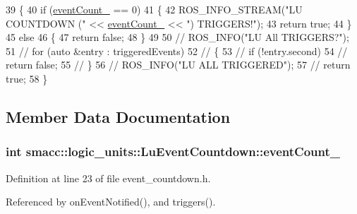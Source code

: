 \begin{DoxyCode}
39 \{
40     \textcolor{keywordflow}{if} (\hyperlink{classsmacc_1_1logic__units_1_1LuEventCountdown_a70fa43cf7f9970cc0b9172d4845a4c2e}{eventCount\_} == 0)
41     \{
42         ROS\_INFO\_STREAM(\textcolor{stringliteral}{"LU COUNTDOWN ("} << \hyperlink{classsmacc_1_1logic__units_1_1LuEventCountdown_a70fa43cf7f9970cc0b9172d4845a4c2e}{eventCount\_} << \textcolor{stringliteral}{") TRIGGERS!"});
43         \textcolor{keywordflow}{return} \textcolor{keyword}{true};
44     \}
45     \textcolor{keywordflow}{else}
46     \{
47         \textcolor{keywordflow}{return} \textcolor{keyword}{false};
48     \}
49 
50     \textcolor{comment}{// ROS\_INFO("LU All TRIGGERS?");}
51     \textcolor{comment}{// for (auto &entry : triggeredEvents)}
52     \textcolor{comment}{// \{}
53     \textcolor{comment}{//     if (!entry.second)}
54     \textcolor{comment}{//         return false;}
55     \textcolor{comment}{// \}}
56     \textcolor{comment}{// ROS\_INFO("LU ALL TRIGGERED");}
57     \textcolor{comment}{// return true;}
58 \}
\end{DoxyCode}


\subsection{Member Data Documentation}
\subsubsection[{\texorpdfstring{event\+Count\+\_\+}{eventCount_}}]{\setlength{\rightskip}{0pt plus 5cm}int smacc\+::logic\+\_\+units\+::\+Lu\+Event\+Countdown\+::event\+Count\+\_\+\hspace{0.3cm}{\ttfamily [private]}}\hypertarget{classsmacc_1_1logic__units_1_1LuEventCountdown_a70fa43cf7f9970cc0b9172d4845a4c2e}{}\label{classsmacc_1_1logic__units_1_1LuEventCountdown_a70fa43cf7f9970cc0b9172d4845a4c2e}


Definition at line 23 of file event\+\_\+countdown.\+h.



Referenced by on\+Event\+Notified(), and triggers().

